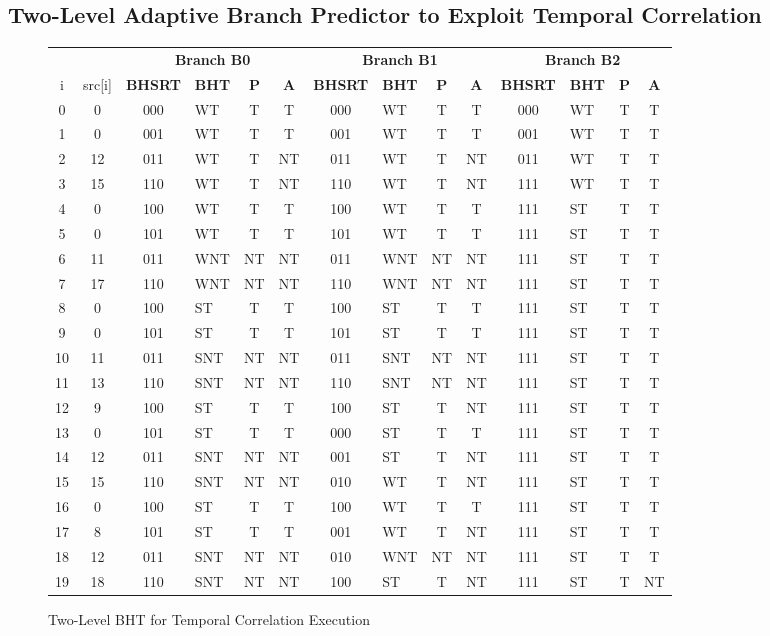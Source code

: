 \documentclass[10pt]{article}
\begin{document}
\subsection{Two-Level Adaptive Branch Predictor to Exploit Temporal Correlation}

\begin{figure}[H]
\centering
{\setlength{\tabcolsep}{3pt}
\begin{tabular}{@{\extracolsep{3pt}}ccclccclccclcc@{}}
\hline
& & \multicolumn{4}{c}{\textbf{Branch B0}} & \multicolumn{4}{c}{\textbf{Branch B1}} & \multicolumn{4}{c}{\textbf{Branch B2}}\\
\cline{3-6}
\cline{7-10}
\cline{11-14}
i & src[i] & \textbf{BHSRT} & \textbf{BHT} & \textbf{P} & \textbf{A} & \textbf{BHSRT} & \textbf{BHT} & \textbf{P} & \textbf{A} & \textbf{BHSRT} & \textbf{BHT} & \textbf{P} & \textbf{A} \\ \hline
0 & 0 & 000 & WT& T & T & 000 & WT& T & T & 000 & WT& T & T \\ \hline
1 & 0 & 001 & WT& T & T & 001 & WT& T & T & 001 & WT& T & T \\ \hline
2 & 12& 011 & WT& T & NT& 011 & WT& T & NT& 011 & WT& T & T \\ \hline
3 & 15& 110 & WT& T & NT& 110 & WT& T & NT& 111 & WT& T & T \\ \hline
4 & 0 & 100 & WT& T & T & 100 & WT& T & T & 111 & ST& T & T \\ \hline
5 & 0 & 101 & WT& T & T & 101 & WT& T & T & 111 & ST& T & T \\ \hline
6 & 11& 011 &WNT& NT& NT& 011 &WNT& NT& NT& 111 & ST& T & T \\ \hline
7 & 17& 110 &WNT& NT& NT& 110 &WNT& NT& NT& 111 & ST& T & T \\ \hline
8 & 0 & 100 & ST& T & T & 100 & ST& T & T & 111 & ST& T & T \\ \hline
9 & 0 & 101 & ST& T & T & 101 & ST& T & T & 111 & ST& T & T \\ \hline
10& 11& 011 &SNT& NT& NT& 011 &SNT& NT& NT& 111 & ST& T & T \\ \hline
11& 13& 110 &SNT& NT& NT& 110 &SNT& NT& NT& 111 & ST& T & T \\ \hline
12& 9 & 100 & ST& T & T & 100 & ST& T & NT& 111 & ST& T & T \\ \hline
13& 0 & 101 & ST& T & T & 000 & ST& T & T & 111 & ST& T & T \\ \hline
14& 12& 011 &SNT& NT& NT& 001 & ST& T & NT& 111 & ST& T & T \\ \hline
15& 15& 110 &SNT& NT& NT& 010 & WT& T & NT& 111 & ST& T & T \\ \hline
16& 0 & 100 & ST& T & T & 100 & WT& T & T & 111 & ST& T & T \\ \hline
17& 8 & 101 & ST& T & T & 001 & WT& T & NT& 111 & ST& T & T \\ \hline
18& 12& 011 &SNT& NT& NT& 010 &WNT& NT& NT& 111 & ST& T & T \\ \hline
19& 18& 110 &SNT& NT& NT& 100 & ST& T & NT& 111 & ST& T & NT\\ \hline
\end{tabular}
}
\caption{Two-Level BHT for Temporal Correlation Execution}
\end{figure}
\end{document}
